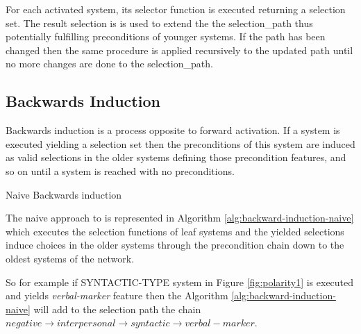 For each activated system, its selector function is executed returning a selection set. The result selection is is used to extend the the selection\_path thus potentially fulfilling preconditions of younger systems. If the path has been changed then the same procedure is applied recursively to the updated path until no more changes are done to the selection\_path. 

\subsection{Backwards Induction}
Backwards induction is a process opposite to forward activation. If a system is executed yielding a selection set then the preconditions of this system are induced as valid selections in the older systems defining those precondition features, and so on until a system is reached with no preconditions. 


\begin{algorithm}
	
\caption{Naive Backwards induction}
\label{alg:backward-induction-naive}
\end{algorithm}

The naive approach to is represented in Algorithm \ref{alg:backward-induction-naive} which executes the selection functions of leaf systems and the yielded selections induce choices in the older systems through the precondition chain down to the oldest systems of the network. 

So for example if SYNTACTIC-TYPE system in Figure \ref{fig:polarity1} is executed and yields \textit{verbal-marker} feature then the Algorithm \ref{alg:backward-induction-naive} will add to the selection path the chain $negative\rightarrow interpersonal\rightarrow syntactic\rightarrow verbal-marker$.

